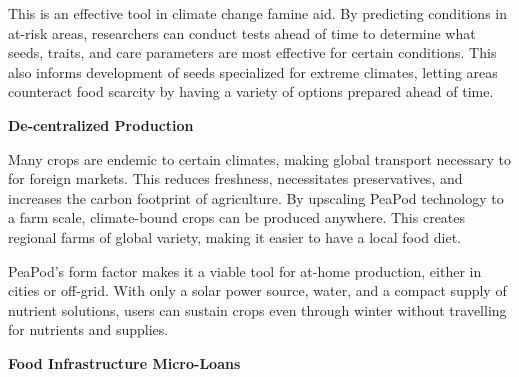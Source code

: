 \documentclass{../tex/report}
\begin{document}
This is an effective tool in climate change famine aid. By predicting conditions in at-risk areas, researchers can conduct tests ahead of time to determine what seeds, traits, and care parameters are most effective for certain conditions. This also informs development of seeds specialized for extreme climates, letting areas counteract food scarcity by having a variety of options prepared ahead of time.

\textbf{De-centralized Production}

Many crops are endemic to certain climates, making global transport necessary to for foreign markets. This reduces freshness, necessitates preservatives, and increases the carbon footprint of agriculture. By upscaling PeaPod technology to a farm scale, climate-bound crops can be produced anywhere. This creates regional farms of global variety, making it easier to have a local food diet.

PeaPod's form factor makes it a viable tool for at-home production, either in cities or off-grid. With only a solar power source, water, and a compact supply of nutrient solutions, users can sustain crops even through winter without travelling for nutrients and supplies.





\textbf{Food Infrastructure Micro-Loans}
\end{document}
